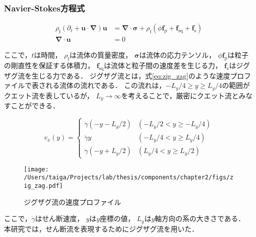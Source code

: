 \subsubsection{Navier-Stokes方程式}
    \begin{align}
        \rho_\mathrm{f} (\partial _t + \boldsymbol{u} \cdot \boldsymbol{\nabla} ) \boldsymbol{u} &= 
            \boldsymbol{\nabla} \cdot \boldsymbol{\sigma} + 
            \rho_\mathrm{f} \left( \phi \boldsymbol{f}_\mathrm{p} + \boldsymbol{f}_\mathrm{sq} + \boldsymbol{f}_\mathrm{s} \right) \\
        \boldsymbol{\nabla} \cdot \boldsymbol{u} &= 0
    \end{align}

ここで，$t$は時間，
$\rho_\mathrm{f}$は流体の質量密度，
$\boldsymbol{\sigma}$は流体の応力テンソル，
$\phi \boldsymbol{f}_\mathrm{p}$は粒子の剛直性を保証する体積力，
$\boldsymbol{f}_\mathrm{sq}$は流体と粒子間の速度差を生じる力，
$\boldsymbol{f}_\mathrm{s}$はジグザグ流を生じる力である．
ジグザグ流とは，式\eqref{eq:zig_zag}のような速度プロファイルで表される流体の流れである．
この流れは，$-L_y/4 \geq y \geq L_y/4$の範囲がクエット流を表しているが，
$L_y \rightarrow \infty$を考えることで，厳密にクエット流とみなすことができる．

    \begin{equation}
        v_x(y) =
        \begin{cases}
            \dot{\gamma} \left( - y - L_y/2 \right) & (-L_y/2 < y \geq -L_y/4) \\
            \dot{\gamma} y                          & (-L_y/4 < y \geq  L_y/4) \\
            \dot{\gamma} \left( - y + L_y/2 \right) & ( L_y/4 < y \geq  L_y/2)
        \end{cases}
        \label{eq:zig_zag}
    \end{equation}

    \begin{figure}[htbp]
        \centering
        \texttt{[image: /Users/taiga/Projects/lab/thesis/components/chapter2/figs/zig\_zag.pdf]}
        \caption{ジグザグ流の速度プロファイル}
        \label{fig:zig_zag}
    \end{figure}

\noindent
ここで，$\dot{\gamma}$はせん断速度，
$y$は$y$座標の値，
$L_y$は$y$軸方向の系の大きさである．
本研究では，せん断流を表現するためにジグザグ流を用いた．
